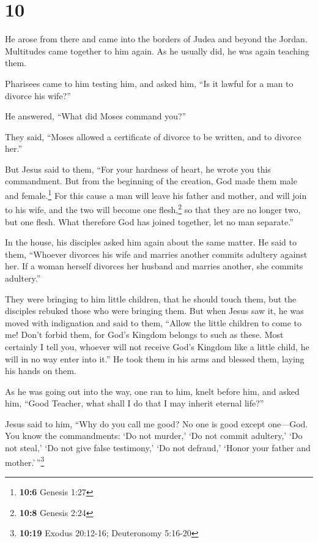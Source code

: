 \hypertarget{section-9}{%
\section{10}\label{section-9}}

 He arose from there and came into the borders of Judea
and beyond the Jordan. Multitudes came together to him again. As he
usually did, he was again teaching them.

 Pharisees came to him testing him, and asked him, ``Is it
lawful for a man to divorce his wife?''

 He answered, ``What did Moses command you?''

 They said, ``Moses allowed a certificate of divorce to be
written, and to divorce her.''

 But Jesus said to them, ``For your hardness of heart, he
wrote you this commandment.  But from the beginning of the
creation, God made them male and female.\footnote{\textbf{10:6} Genesis
  1:27}  For this cause a man will leave his father and
mother, and will join to his wife,  and the two will
become one flesh,\footnote{\textbf{10:8} Genesis 2:24} so that they are
no longer two, but one flesh.  What therefore God has
joined together, let no man separate.''

 In the house, his disciples asked him again about the
same matter.  He said to them, ``Whoever divorces his
wife and marries another commits adultery against her. 
If a woman herself divorces her husband and marries another, she commits
adultery.''

 They were bringing to him little children, that he
should touch them, but the disciples rebuked those who were bringing
them.  But when Jesus saw it, he was moved with
indignation and said to them, ``Allow the little children to come to me!
Don't forbid them, for God's Kingdom belongs to such as these.
 Most certainly I tell you, whoever will not receive
God's Kingdom like a little child, he will in no way enter into it.''
 He took them in his arms and blessed them, laying his
hands on them.

 As he was going out into the way, one ran to him, knelt
before him, and asked him, ``Good Teacher, what shall I do that I may
inherit eternal life?''

 Jesus said to him, ``Why do you call me good? No one is
good except one---God.  You know the commandments: `Do
not murder,' `Do not commit adultery,' `Do not steal,' `Do not give
false testimony,' `Do not defraud,' `Honor your father and
mother.'\,''\footnote{\textbf{10:19} Exodus 20:12-16; Deuteronomy
  5:16-20}

